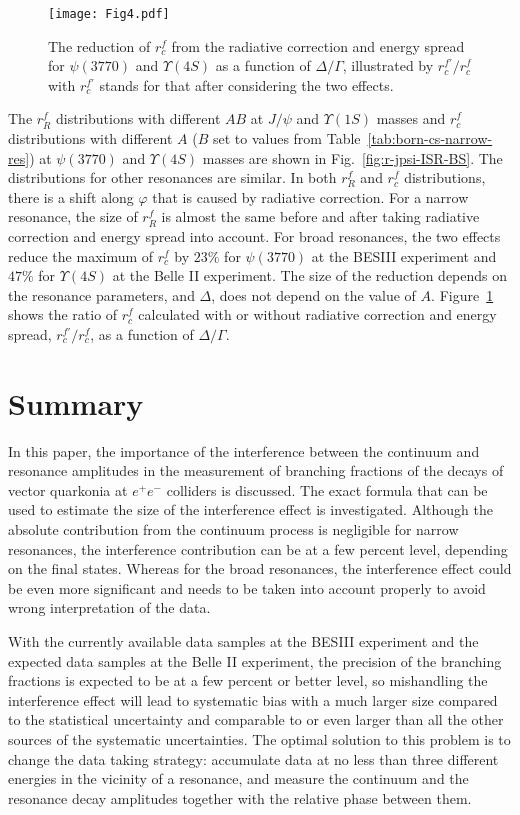 \documentclass[%
preprint,
 amsmath,amssymb,
 aps,
]{revtex4-2}
\newcommand{\EE}{e^+e^-}
\newcommand{\psipp}{\psi(3770)}
\newcommand{\jpsi}{J/\psi}
\newcommand{\upsi}{\Upsilon(1S)}
\begin{document}
\begin{figure}[htbp]
    \centering
    \texttt{[image: Fig4.pdf]}
\caption{The reduction of $r_{c}^{f}$ from the radiative correction and energy spread
for $\psipp$ and $\Upsilon(4S)$ as a function of $\Delta/\Gamma$, illustrated by $r_{c}^{f\prime}/r_{c}^{f}$
with $r_{c}^{f\prime}$ stands for that after considering the two effects.
}
 \label{fig:ratio-rc-as-BS}
\end{figure}

The $r_{R}^{f}$ distributions with different $AB$ at $\jpsi$ and $\upsi$ masses and 
$r_c^{f}$ distributions with different $A$ ($B$ set to values from
Table~\ref{tab:born-cs-narrow-res})
at $\psipp$ and $\Upsilon(4S)$ masses are shown in Fig.~\ref{fig:r-jpsi-ISR-BS}. 
The distributions for other resonances are similar. 
In both $r_{R}^{f}$ and $r_{c}^{f}$ distributions, there is a shift along $\varphi$
that is caused by radiative correction. For a narrow resonance, the size of 
$r_{R}^{f}$ is almost the same before and after taking radiative correction and energy 
spread into account. For broad resonances, the two effects reduce
the maximum of $r_c^{f}$ by $23\%$ for $\psipp$ at the BESIII experiment
and $47\%$ for $\Upsilon(4S)$ at the Belle II experiment. The size of the reduction 
depends on the resonance parameters, and $\Delta$, does not depend on the value of $A$.  
Figure~\ref{fig:ratio-rc-as-BS} shows the ratio of $r_c^{f}$ calculated with or 
without radiative correction and energy spread, $r_{c}^{f\prime}/r_c^{f}$, as a function of $\Delta/\Gamma$.

\section{Summary}

In this paper, the importance of the interference between the continuum and 
resonance amplitudes in the measurement of branching fractions of the decays 
of vector quarkonia at $\EE$ colliders is discussed. 
The exact formula that can be used to estimate the size of the interference effect 
is investigated. Although the absolute contribution from the continuum process 
is negligible for narrow resonances, the interference contribution can be at a few percent level, 
depending on the final states. Whereas for the broad resonances, 
the interference effect could be even more significant and needs to be taken into account 
properly to avoid wrong interpretation of the data. 

With the currently available data samples at the BESIII experiment and the
expected data samples at the Belle II experiment, the precision 
of the branching fractions is expected to be at a few percent or better level, 
so mishandling the interference effect will lead to systematic 
bias with a much larger size compared to the statistical uncertainty and comparable 
to or even larger than all the other sources of the systematic uncertainties. 
The optimal solution to this problem is to change the data taking strategy:
accumulate data at no less than three different energies in the vicinity of a 
resonance, and measure the continuum and the resonance decay amplitudes
together with the relative phase between them.
\end{document}
